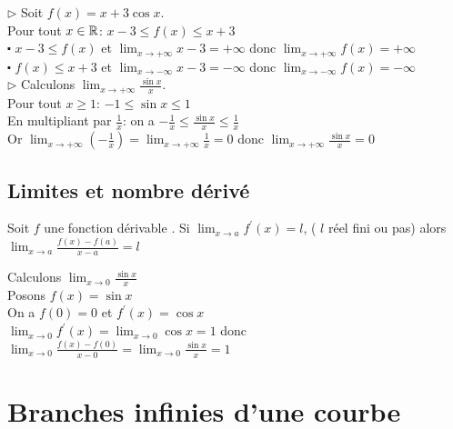 \begin{example}
$\triangleright $ Soit $ f(x)= x+ 3\cos x $.\\
Pour tout $x\in\mathbb{R}$: \quad $ x-3\leq f(x)\leq x+3 $ \\
$ \centerdot $ $ x-3\leq f(x)$ et $\displaystyle \lim_{x \to +\infty}x-3=+\infty  $ donc $ \displaystyle \lim_{x \to +\infty}f(x)=+\infty $\\
$ \centerdot $ $  f(x)\leq x+3$ et $\displaystyle \lim_{x \to -\infty}x-3=-\infty  $ donc $ \displaystyle \lim_{x \to -\infty}f(x)=-\infty $ \\

$ \triangleright $ Calculons $\displaystyle\lim_{x \to +\infty}\frac{\sin x}{x} $.\\

Pour tout $ x\geq 1 $: $ -1\leq\sin x \leq 1 $ \\
En multipliant par $ \frac{1}{x} $: on a $ -\frac{1}{x}\leq \frac{\sin x}{x} \leq\frac{1}{x} $\\
Or $\displaystyle\lim_{x \to +\infty}(-\frac{1}{x})= \displaystyle\lim_{x \to +\infty}\frac{1}{x}=0$ donc $\displaystyle\lim_{x \to +\infty}\frac{\sin x}{x}=0 $
\end{example}


\subsection{Limites et nombre dérivé}

\begin{theorem}
Soit $ f $ une fonction dérivable .
Si $\displaystyle \lim_{x \to a}f^{'}(x)=l$,\;  ( $l$ réel fini ou pas) alors $\displaystyle\lim_{x \to a} \frac{f(x)-f(a)}{x-a}=l$
\end{theorem}

\begin{example}
Calculons $\displaystyle\lim_{x \to 0}\frac{\sin x}{x} $\\

Posons $ f(x)=\sin x $\\
On a $ f(0)=0 $ et  $ f^{'}(x)=\cos x$\\
 $ \displaystyle\lim_{x \to 0}f^{'}(x)=\displaystyle\lim_{x \to 0}\cos x=1 $ donc $\displaystyle \lim_{x \to 0} \frac{f(x)-f(0)}{x-0}=\displaystyle \lim_{x \to 0}\frac{\sin x}{x}=1$
\end{example}

\section{Branches infinies d'une courbe}

